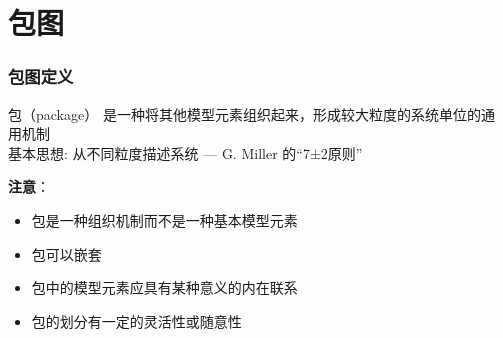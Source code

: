 \documentclass[compress]{beamer}
\begin{document}
\section{包图}

\begin{frame}
\frametitle{包图定义}
\begin{block} {包（package）}
  是一种将其他模型元素组织起来，形成较大粒度的系统单位的通
  用机制 \\
  基本思想: 从不同粒度描述系统 --- G. Miller 的“7±2原则” 
\end{block}


  \alert{\textbf{注意}}：
  \begin{itemize}
    \item 包是一种组织机制而不是一种基本模型元素
    \item 包可以嵌套
    \item 包中的模型元素应具有某种意义的内在联系
    \item 包的划分有一定的灵活性或随意性  
  \end{itemize}
\end{frame}
\end{document}
